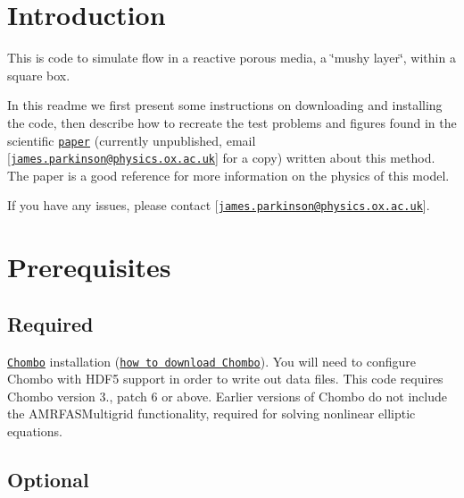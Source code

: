 \section*{Introduction}

This is code to simulate flow in a reactive porous media, a \char`\"{}mushy layer\char`\"{}, within a square box.

In this readme we first present some instructions on downloading and installing the code, then describe how to recreate the test problems and figures found in the scientific \href{#}{\tt paper} (currently unpublished, email \mbox{[}\href{mailto:james.parkinson@physics.ox.ac.uk}{\tt james.\+parkinson@physics.\+ox.\+ac.\+uk}\mbox{]} for a copy) written about this method. The paper is a good reference for more information on the physics of this model.

If you have any issues, please contact \mbox{[}\href{mailto:james.parkinson@physics.ox.ac.uk}{\tt james.\+parkinson@physics.\+ox.\+ac.\+uk}\mbox{]}.

\section*{Prerequisites}

\subsection*{Required}


\begin{DoxyItemize}
\item \href{https://commons.lbl.gov/display/chombo/Chombo+-+Software+for+Adaptive+Solutions+of+Partial+Differential+Equations}{\tt Chombo} installation (\href{https://anag-repo.lbl.gov/chombo-3.2/access.html}{\tt how to download Chombo}). You will need to configure Chombo with H\+D\+F5 support in order to write out data files. This code requires Chombo version 3., patch 6 or above. Earlier versions of Chombo do not include the {\ttfamily A\+M\+R\+F\+A\+S\+Multigrid} functionality, required for solving nonlinear elliptic equations.
\end{DoxyItemize}

\subsection*{Optional}


